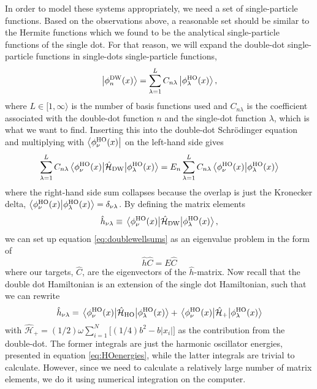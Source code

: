 In order to model these systems appropriately, we need a set of single-particle functions. Based on the observations above, a reasonable set should be similar to the Hermite functions which we found to be the analytical single-particle functions of the single dot. For that reason, we will expand the double-dot single-particle functions in single-dots single-particle functions,
\begin{equation}
\ket{\phi_n^{\text{DW}}(x)}=\sum_{\lambda=1}^{L}C_{n\lambda}\ket{\phi_{\lambda}^{\text{HO}}(x)},
\end{equation}
where $L\in[1,\infty\rangle$ is the number of basis functions used and $C_{n\lambda}$ is the coefficient associated with the double-dot function $n$ and the single-dot function $\lambda$, which is what we want to find. Inserting this into the double-dot Schrödinger equation and multiplying with $\bra{\phi_{\nu}^{\text{HO}}(x)}$ on the left-hand side gives
\begin{equation}
\label{eq:doublewellsums}
\sum_{\lambda=1}^LC_{n\lambda}\mel{\phi_{\nu}^{\text{HO}}(x)}{\hat{\mathcal{H}}_{\text{DW}}}{\phi_{\lambda}^{\text{HO}}(x)}=E_n\sum_{\lambda=1}^LC_{n\lambda}\braket{\phi_{\nu}^{\text{HO}}(x)}{\phi_{\lambda}^{\text{HO}}(x)}
\end{equation}
where the right-hand side sum collapses because the overlap is just the Kronecker delta, $\braket{\phi_{\nu}^{\text{HO}}(x)}{\phi_{\lambda}^{\text{HO}}(x)}=\delta_{\nu\lambda}$. By defining the matrix elements
\begin{equation}
\hat{h}_{\nu\lambda}\equiv\mel{\phi_{\nu}^{\text{HO}}(x)}{\hat{\mathcal{H}}_{\text{DW}}}{\phi_{\lambda}^{\text{HO}}(x)},
\end{equation}
we can set up equation \eqref{eq:doublewellsums} as an eigenvalue problem in the form of
\begin{equation}
\hat{h}\hat{C}=E\hat{C}
\end{equation}
where our targets, $\hat{C}$, are the eigenvectors of the $\hat{h}$-matrix. Now recall that the double dot Hamiltonian is an extension of the single dot Hamiltonian, such that we can rewrite
\begin{equation}
\hat{h}_{\nu\lambda}=\mel{\phi_{\nu}^{\text{HO}}(x)}{\hat{\mathcal{H}}_{\text{HO}}}{\phi_{\lambda}^{\text{HO}}(x)}+\mel{\phi_{\nu}^{\text{HO}}(x)}{\hat{\mathcal{H}}_{\text{+}}}{\phi_{\lambda}^{\text{HO}}(x)}
\end{equation}
with $\hat{\mathcal{H}}_{\text{+}}=(1/2)\omega\sum_{i=1}^N\Big[(1/4)b^2-b|x_i|\Big]$ as the contribution from the double-dot. The former integrals are just the harmonic oscillator energies, presented in equation \eqref{eq:HOenergies}, while the latter integrals are trivial to calculate. However, since we need to calculate a relatively large number of matrix elements, we do it using numerical integration on the computer.

